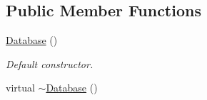 \subsection*{Public Member Functions}
\begin{DoxyCompactItemize}
\item 
\hypertarget{class_c_a_r_o_m_1_1_database_a52d814f0e3f7ab79a7a81df58a269e24}{\hyperlink{class_c_a_r_o_m_1_1_database_a52d814f0e3f7ab79a7a81df58a269e24}{Database} ()}\label{class_c_a_r_o_m_1_1_database_a52d814f0e3f7ab79a7a81df58a269e24}

\begin{DoxyCompactList}\small\item\em Default constructor. \end{DoxyCompactList}\item 
\hypertarget{class_c_a_r_o_m_1_1_database_ac30c27c5448929dd1817475c766e212d}{virtual \hyperlink{class_c_a_r_o_m_1_1_database_ac30c27c5448929dd1817475c766e212d}{$\sim$\-Database} ()}\label{class_c_a_r_o_m_1_1_database_ac30c27c5448929dd1817475c766e212d}


\end{DoxyCompactItemize}
